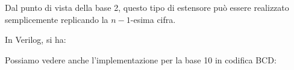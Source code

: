 \documentclass[a4paper,11pt]{article}
\begin{document}
Dal punto di vista della base 2, questo tipo di estensore può essere realizzato semplicemente replicando la $n-1$-esima cifra.

In Verilog, si ha:



Possiamo vedere anche l'implementazione per la base 10 in codifica BCD:


\end{document}
